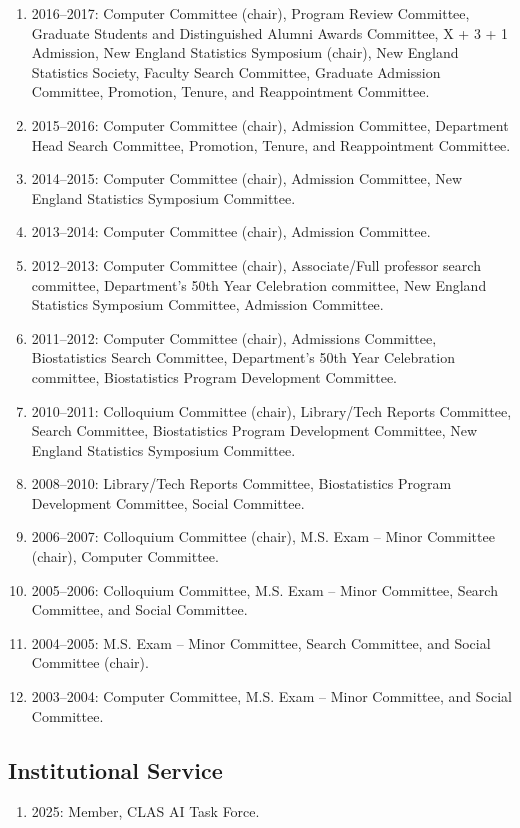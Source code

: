 \documentclass[Statistics]{vita}
\begin{document}
\begin{vita}
\begin{enumerate}
  \item 2016--2017: Computer Committee (chair), Program Review Committee, Graduate Students and Distinguished Alumni Awards Committee, X + 3 + 1 Admission, New England Statistics Symposium (chair), New England Statistics Society, Faculty Search Committee, Graduate Admission Committee, Promotion, Tenure, and Reappointment Committee.
  \item 2015--2016: Computer Committee (chair), Admission Committee, Department Head Search Committee, Promotion, Tenure, and Reappointment Committee.
  \item 2014--2015: Computer Committee (chair), Admission Committee, New England Statistics Symposium Committee.
  \item 2013--2014: Computer Committee (chair), Admission Committee.
  \item 2012--2013: Computer Committee (chair), Associate/Full professor search committee, Department's 50th Year Celebration committee, New England Statistics Symposium Committee, Admission Committee.
  \item 2011--2012: Computer Committee (chair), Admissions Committee, Biostatistics Search Committee,  Department's 50th Year Celebration committee, Biostatistics Program Development Committee.
  \item 2010--2011: Colloquium Committee (chair), Library/Tech Reports Committee, Search Committee, Biostatistics Program Development Committee, New England Statistics Symposium Committee.
  \item 2008--2010: Library/Tech Reports Committee, Biostatistics Program Development Committee, Social Committee.
  \item 2006--2007: Colloquium Committee (chair), M.S. Exam -- Minor Committee (chair), Computer Committee.
  \item 2005--2006: Colloquium Committee, M.S. Exam -- Minor Committee, Search Committee, and Social Committee.
  \item 2004--2005: M.S. Exam -- Minor Committee, Search Committee, and Social Committee (chair).
  \item 2003--2004: Computer Committee, M.S. Exam -- Minor Committee, and Social Committee.
  \end{enumerate}
  \subsection{Institutional Service}
  \begin{enumerate}
  \item 2025: Member, CLAS AI Task Force.
  \end{enumerate}

\end{vita}
\end{document}
